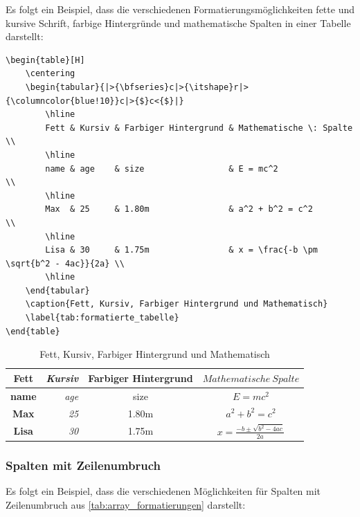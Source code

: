 Es folgt ein Beispiel, dass die verschiedenen Formatierungsmöglichkeiten fette und kursive Schrift, farbige Hintergründe und mathematische Spalten in einer Tabelle darstellt:

\begin{lstlisting}[language={[LaTeX]TeX}, basicstyle=\footnotesize\ttfamily]
\begin{table}[H]
    \centering
    \begin{tabular}{|>{\bfseries}c|>{\itshape}r|>{\columncolor{blue!10}}c|>{$}c<{$}|}
        \hline
        Fett & Kursiv & Farbiger Hintergrund & Mathematische \: Spalte                \\
        \hline
        name & age    & size                 & E = mc^2                               \\
        \hline
        Max  & 25     & 1.80m                & a^2 + b^2 = c^2                        \\
        \hline
        Lisa & 30     & 1.75m                & x = \frac{-b \pm \sqrt{b^2 - 4ac}}{2a} \\
        \hline
    \end{tabular}
    \caption{Fett, Kursiv, Farbiger Hintergrund und Mathematisch}
    \label{tab:formatierte_tabelle}
\end{table}
\end{lstlisting}

\begin{table}[H]
    \centering
    \begin{tabular}{|>{\bfseries}c|>{\itshape}r|>{\columncolor{blue!10}}c|>{$}c<{$}|}
        \hline
        Fett & Kursiv & Farbiger Hintergrund & Mathematische \: Spalte                \\
        \hline
        name & age    & size                 & E = mc^2                               \\
        \hline
        Max  & 25     & 1.80m                & a^2 + b^2 = c^2                        \\
        \hline
        Lisa & 30     & 1.75m                & x = \frac{-b \pm \sqrt{b^2 - 4ac}}{2a} \\
        \hline
    \end{tabular}
    \caption{Fett, Kursiv, Farbiger Hintergrund und Mathematisch}
    \label{tab:formatierte_tabelle}
\end{table}

\subsubsection{Spalten mit Zeilenumbruch}
Es folgt ein Beispiel, dass die verschiedenen Möglichkeiten für Spalten mit Zeilenumbruch aus \autoref{tab:array_formatierungen} darstellt:

